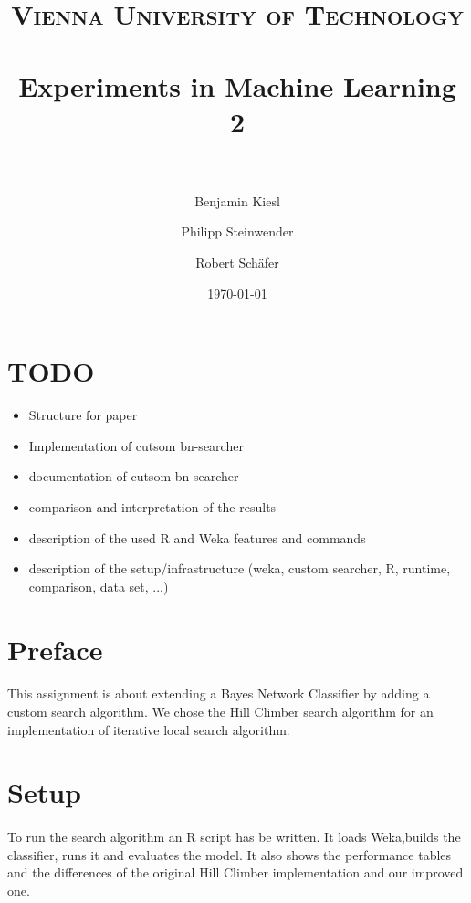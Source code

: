 \documentclass[paper=a4, fontsize=11pt]{scrartcl} %
\title{ 
\normalfont \normalsize 
\textsc{Vienna University of Technology} \\ [25pt] %
\horrule{0.5pt} \\[0.4cm] %
\huge Experiments in Machine Learning 2 \\ %
\horrule{2pt} \\[0.5cm] %
}
\author{Benjamin Kiesl \and Philipp Steinwender \and Robert Sch\"{a}fer} %
\date{\normalsize\today} %
\numberwithin{equation}{section} %
\numberwithin{figure}{section} %
\numberwithin{table}{section} %
\begin{document}
\maketitle %


\tableofcontents

%
%
%
\section{TODO}

\begin{itemize}
\item Structure for paper
\item Implementation of cutsom bn-searcher
\item documentation of cutsom bn-searcher
\item comparison and interpretation of the results
\item description of the used R and Weka features and commands
\item description of the setup/infrastructure (weka, custom searcher, R, runtime, comparison, data set, ...)
\end{itemize}

%
%
%
\section{Preface}

\paragraph{}This assignment is about extending a Bayes Network Classifier by adding a custom search algorithm. We chose the Hill Climber search algorithm for an implementation of iterative local search algorithm.

%
%
%
\section{Setup}

\paragraph{}To run the search algorithm an R script has be written. It loads Weka,builds the classifier, runs it and evaluates the model. It also shows the performance tables and the differences of the original Hill Climber implementation and our improved one.
\end{document}
